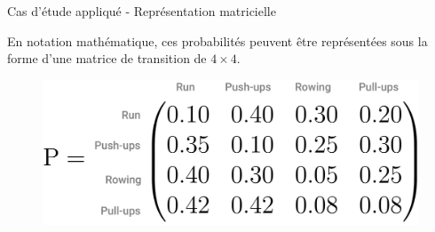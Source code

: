 \documentclass[aspectratio=169,xcolor=dvipsnames, t]{beamer}
\begin{document}
\begin{frame}{Cas d'étude appliqué - Représentation matricielle}
	
	En notation mathématique, ces probabilités peuvent être représentées sous la forme d'une matrice de transition de $4\times4$.
	
	\begin{figure}
		\includegraphics[height=0.4\paperheight]{figures/matriceTransition.png}
	\end{figure}
	
\end{frame}
\end{document}
